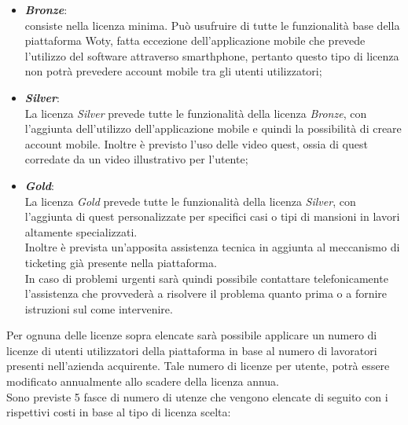 \begin{itemize}
\item \textbf{\textit{Bronze}}:\\
consiste nella licenza minima.
Può usufruire di tutte le funzionalità base della piattaforma Woty, fatta eccezione dell'applicazione mobile che prevede l'utilizzo del software attraverso smarthphone, pertanto questo tipo di licenza non potrà prevedere account mobile tra gli utenti utilizzatori;


\item \textbf{\textit{Silver}}:\\
La licenza \textit{Silver} prevede tutte le funzionalità della licenza \textit{Bronze}, con l'aggiunta dell'utilizzo dell'applicazione mobile e quindi la possibilità di creare account mobile.
Inoltre è previsto l'uso delle video quest, ossia di quest corredate da un video illustrativo per l'utente;


\item \textbf{\textit{Gold}}:\\
La licenza \textit{Gold} prevede tutte le funzionalità della licenza \textit{Silver}, con l'aggiunta di quest personalizzate per specifici casi o tipi di mansioni in lavori altamente specializzati.\\
Inoltre è prevista un'apposita assistenza tecnica in aggiunta al meccanismo di ticketing già presente nella piattaforma.\\
In caso di problemi urgenti sarà quindi possibile contattare telefonicamente l'assistenza che provvederà a risolvere il problema quanto prima o a fornire istruzioni sul come intervenire.\\

\end{itemize}

Per ognuna delle licenze sopra elencate sarà possibile applicare un numero di licenze di utenti utilizzatori della piattaforma in base al numero di lavoratori presenti nell'azienda acquirente. Tale numero di licenze per utente, potrà essere modificato annualmente allo scadere della licenza annua.\\
Sono previste 5 fasce di numero di utenze che vengono elencate di seguito con i rispettivi costi in base al tipo di licenza scelta:

